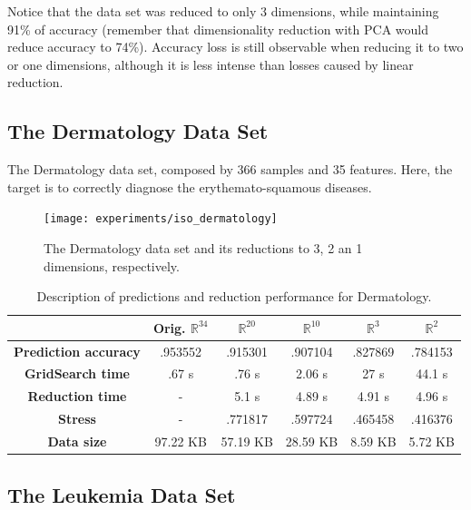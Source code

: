 Notice that the data set was reduced to only 3 dimensions, while maintaining 91\% of accuracy (remember that dimensionality reduction with PCA would reduce accuracy to 74\%). Accuracy loss is still observable when reducing it to two or one dimensions, although it is less intense than losses caused by linear reduction.

\newpage
\subsection{The Dermatology Data Set}

The Dermatology data set, composed by 366 samples and 35 features. Here, the target is to correctly diagnose the erythemato-squamous diseases.

\begin{figure}[H]
	\centering
	\texttt{[image: experiments/iso\_dermatology]}
	\captionsetup{justification=centering}
	\caption{The Dermatology data set and its reductions to 3, 2 an 1 dimensions, respectively.}
\end{figure}

\begin{table}[H]
	\centering
	\begin{tabular}{|c|c|c|c|c|c|}
		\hline
		& \textbf{Orig. $\mathbb{R}^{34}$} & \textbf{$\mathbb{R}^{20}$} & \textbf{$\mathbb{R}^{10}$} & \textbf{$\mathbb{R}^3$} & \textbf{$\mathbb{R}^2$} \\\hline
		\textbf{Prediction accuracy}  & .953552 & .915301 & .907104 & .827869 & .784153 \\\hline
		\textbf{GridSearch time} & .67 s & .76 s & 2.06 s & 27 s & 44.1 s  \\\hline
		\textbf{Reduction time}  & -         & 5.1 s & 4.89 s & 4.91 s & 4.96 s    \\\hline
		\textbf{Stress} & - & .771817 & .597724 & .465458 & .416376 \\\hline
		\textbf{Data size}          & 97.22 KB & 57.19 KB & 28.59 KB  & 8.59 KB & 5.72 KB  \\\hline
	\end{tabular}
	
	\caption{Description of predictions and reduction performance for Dermatology.}
\end{table}

\newpage
\subsection{The Leukemia Data Set}

